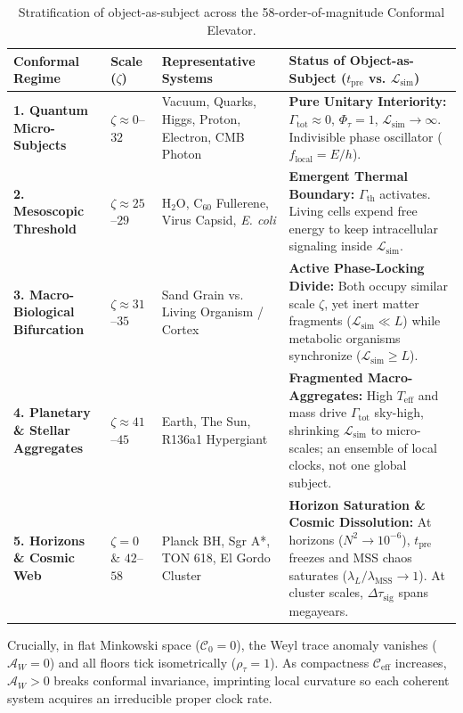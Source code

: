 \documentclass[11pt,a4paper]{article}
\begin{document}
\begin{table}[h!]
\centering
\small
\begin{tabularx}{\textwidth}{@{}l l l X@{}}
\toprule
\textbf{Conformal Regime} & \textbf{Scale ($\zeta$)} & \textbf{Representative Systems} & \textbf{Status of Object-as-Subject ($t_{\text{pre}}$ vs. $\mathcal{L}_{\text{sim}}$)} \\
\midrule
\textbf{1. Quantum Micro-Subjects} & $\zeta \approx 0$--$32$ & Vacuum, Quarks, Higgs, Proton, Electron, CMB Photon & \textbf{Pure Unitary Interiority:} $\Gamma_{\text{tot}} \approx 0$, $\Phi_\tau = 1$, $\mathcal{L}_{\text{sim}} \to \infty$. Indivisible phase oscillator ($f_{\text{local}} = E/h$). \\
\addlinespace[0.4em]
\textbf{2. Mesoscopic Threshold} & $\zeta \approx 25$--$29$ & $\text{H}_2\text{O}$, $\text{C}_{60}$ Fullerene, Virus Capsid, \textit{E. coli} & \textbf{Emergent Thermal Boundary:} $\Gamma_{\text{th}}$ activates. Living cells expend free energy to keep intracellular signaling inside $\mathcal{L}_{\text{sim}}$. \\
\addlinespace[0.4em]
\textbf{3. Macro-Biological Bifurcation} & $\zeta \approx 31$--$35$ & Sand Grain vs. Living Organism / Cortex & \textbf{Active Phase-Locking Divide:} Both occupy similar scale $\zeta$, yet inert matter fragments ($\mathcal{L}_{\text{sim}} \ll L$) while metabolic organisms synchronize ($\mathcal{L}_{\text{sim}} \ge L$). \\
\addlinespace[0.4em]
\textbf{4. Planetary \& Stellar Aggregates} & $\zeta \approx 41$--$45$ & Earth, The Sun, R136a1 Hypergiant & \textbf{Fragmented Macro-Aggregates:} High $T_{\text{eff}}$ and mass drive $\Gamma_{\text{tot}}$ sky-high, shrinking $\mathcal{L}_{\text{sim}}$ to micro-scales; an ensemble of local clocks, not one global subject. \\
\addlinespace[0.4em]
\textbf{5. Horizons \& Cosmic Web} & $\zeta = 0$ \& $42$--$58$ & Planck BH, Sgr A*, TON 618, El Gordo Cluster & \textbf{Horizon Saturation \& Cosmic Dissolution:} At horizons ($N^2 \to 10^{-6}$), $t_{\text{pre}}$ freezes and MSS chaos saturates ($\lambda_L/\lambda_{\text{MSS}} \to 1$). At cluster scales, $\Delta\tau_{\text{sig}}$ spans megayears. \\
\bottomrule
\end{tabularx}
\caption{Stratification of object-as-subject across the 58-order-of-magnitude Conformal Elevator.}
\end{table}

Crucially, in flat Minkowski space ($\mathcal{C}_0 = 0$), the Weyl trace anomaly vanishes ($\mathcal{A}_W = 0$) and all floors tick isometrically ($\rho_\tau = 1$). As compactness $\mathcal{C}_{\text{eff}}$ increases, $\mathcal{A}_W > 0$ breaks conformal invariance, imprinting local curvature so each coherent system acquires an irreducible proper clock rate.
\end{document}
